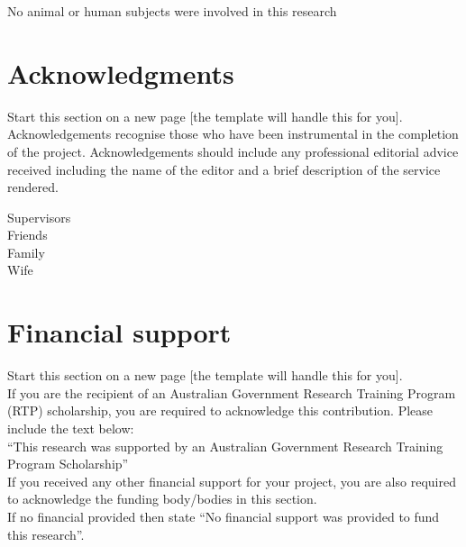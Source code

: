 
No animal or human subjects were involved in this research



\clearpage
\section*{Acknowledgments}

\begin{instructional}
    Start this section on a new page [the template will handle this for you].\\
    
    \noindent
    Acknowledgements recognise those who have been instrumental in the completion of the project.  Acknowledgements should include any professional editorial advice received including the name of the editor and a brief description of the service rendered.
\end{instructional}

\noindent
Supervisors\\

\noindent
Friends\\

\noindent
Family\\

\noindent
Wife\\



\clearpage
\section*{Financial support}

\begin{instructional}
    Start this section on a new page [the template will handle this for you].\\
    
    \noindent
    If you are the recipient of an Australian Government Research Training Program (RTP) scholarship, you are required to acknowledge this contribution.  Please include the text below:\\
    
    \noindent
    ``This research was supported by an Australian Government Research Training Program Scholarship''\\
    
    \noindent
    If you received any other financial support for your project, you are also required to acknowledge the funding body/bodies in this section.\\
    
    \noindent
    If no financial provided then state ``No financial support was provided to fund this research''.
\end{instructional}

